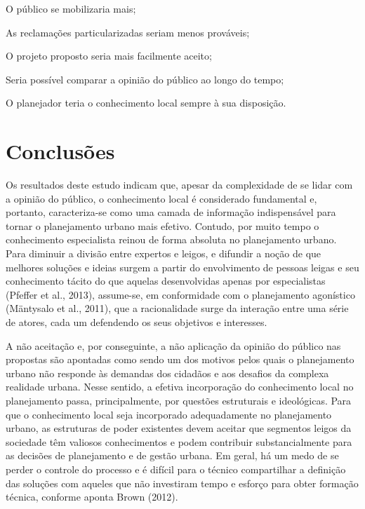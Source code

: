\documentclass{article}
\begin{document}
O público se mobilizaria mais;

As reclamações particularizadas seriam menos prováveis;

O projeto proposto seria mais facilmente aceito;

Seria possível comparar a opinião do público ao longo do tempo;

O planejador teria o conhecimento local sempre à sua disposição.

\section{Conclusões}

Os resultados deste estudo indicam que, apesar da complexidade de se lidar com a
opinião do público, o conhecimento local é considerado fundamental e, portanto,
caracteriza-se como uma camada de informação indispensável para tornar o
planejamento urbano mais efetivo. Contudo, por muito tempo o conhecimento
especialista reinou de forma absoluta no planejamento urbano. Para diminuir a
divisão entre expertos e leigos, e difundir a noção de que melhores soluções e
ideias surgem a partir do envolvimento de pessoas leigas e seu conhecimento
tácito
do que aquelas desenvolvidas apenas por especialistas (Pfeffer et al., 2013),
assume-se, em conformidade com o
planejamento agonístico (Mäntysalo et al.,
2011), que a racionalidade surge da interação entre uma série de atores,
cada um defendendo os seus objetivos e interesses.

A não aceitação e, por conseguinte, a não aplicação da opinião do público nas
propostas são apontadas como sendo um dos motivos pelos quais o planejamento
urbano
não responde às demandas dos cidadãos e aos desafios da complexa realidade
urbana.
Nesse sentido, a efetiva incorporação do conhecimento local no planejamento
passa,
principalmente, por questões estruturais e ideológicas. Para que o conhecimento
local seja incorporado adequadamente no planejamento urbano, as estruturas de
poder
existentes devem aceitar que segmentos leigos da sociedade têm valiosos
conhecimentos e podem contribuir substancialmente para as decisões de
planejamento e
de gestão urbana. Em geral, há um medo de se perder o controle do processo e é
difícil para o técnico compartilhar a definição das soluções com aqueles que não
investiram tempo e esforço para obter formação técnica, conforme aponta Brown
(2012).
\end{document}
